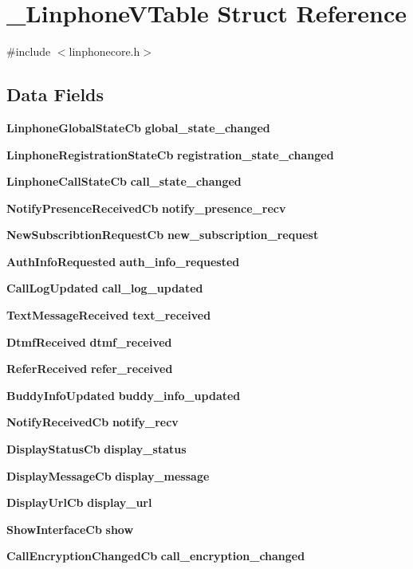 \section{\-\_\-\-Linphone\-V\-Table \-Struct \-Reference}
\label{struct__LinphoneVTable}


{\ttfamily \#include $<$linphonecore.\-h$>$}

\subsection*{\-Data \-Fields}
\begin{DoxyCompactItemize}
\item 
{\bf \-Linphone\-Global\-State\-Cb} {\bf global\-\_\-state\-\_\-changed}
\item 
{\bf \-Linphone\-Registration\-State\-Cb} {\bf registration\-\_\-state\-\_\-changed}
\item 
{\bf \-Linphone\-Call\-State\-Cb} {\bf call\-\_\-state\-\_\-changed}
\item 
{\bf \-Notify\-Presence\-Received\-Cb} {\bf notify\-\_\-presence\-\_\-recv}
\item 
{\bf \-New\-Subscribtion\-Request\-Cb} {\bf new\-\_\-subscription\-\_\-request}
\item 
{\bf \-Auth\-Info\-Requested} {\bf auth\-\_\-info\-\_\-requested}
\item 
{\bf \-Call\-Log\-Updated} {\bf call\-\_\-log\-\_\-updated}
\item 
{\bf \-Text\-Message\-Received} {\bf text\-\_\-received}
\item 
{\bf \-Dtmf\-Received} {\bf dtmf\-\_\-received}
\item 
{\bf \-Refer\-Received} {\bf refer\-\_\-received}
\item 
{\bf \-Buddy\-Info\-Updated} {\bf buddy\-\_\-info\-\_\-updated}
\item 
{\bf \-Notify\-Received\-Cb} {\bf notify\-\_\-recv}
\item 
{\bf \-Display\-Status\-Cb} {\bf display\-\_\-status}
\item 
{\bf \-Display\-Message\-Cb} {\bf display\-\_\-message}
\item 
{\bf \-Display\-Url\-Cb} {\bf display\-\_\-url}
\item 
{\bf \-Show\-Interface\-Cb} {\bf show}
\item 
{\bf \-Call\-Encryption\-Changed\-Cb} {\bf call\-\_\-encryption\-\_\-changed}
\end{DoxyCompactItemize}


